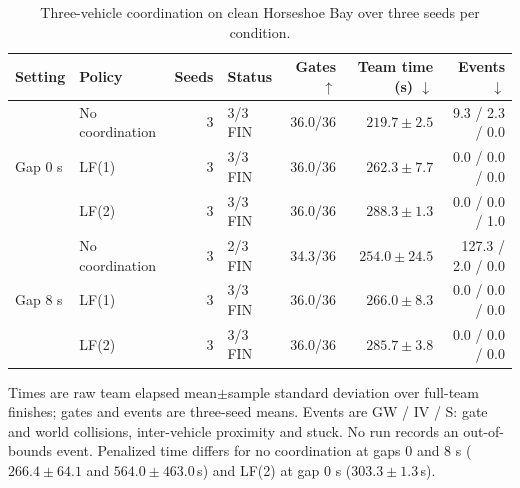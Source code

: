 \begin{table}[t]
\centering
\caption{Three-vehicle coordination on clean Horseshoe Bay over three seeds per condition.}
\label{tab:holoocean_coordination}
\mratablestyle
\begin{tabular}{llrlrrr}
\toprule
Setting & Policy & Seeds & Status & Gates $\uparrow$ & Team time (s) $\downarrow$ & Events $\downarrow$ \\
\midrule
\multirow{3}{*}{Gap 0 s}
 & No coordination & 3 & 3/3 FIN & 36.0/36 & $219.7\pm2.5$ & 9.3 / 2.3 / 0.0 \\
 & LF(1) & 3 & 3/3 FIN & 36.0/36 & $262.3\pm7.7$ & 0.0 / 0.0 / 0.0 \\
 & LF(2) & 3 & 3/3 FIN & 36.0/36 & $288.3\pm1.3$ & 0.0 / 0.0 / 1.0 \\
\midrule
\multirow{3}{*}{Gap 8 s}
 & No coordination & 3 & 2/3 FIN & 34.3/36 & $254.0\pm24.5$ & 127.3 / 2.0 / 0.0 \\
 & LF(1) & 3 & 3/3 FIN & 36.0/36 & $266.0\pm8.3$ & 0.0 / 0.0 / 0.0 \\
 & LF(2) & 3 & 3/3 FIN & 36.0/36 & $285.7\pm3.8$ & 0.0 / 0.0 / 0.0 \\
\bottomrule
\end{tabular}
\mratablenote Times are raw team elapsed mean$\pm$sample standard deviation over full-team finishes; gates and events are three-seed means. Events are GW / IV / S: gate and world collisions, inter-vehicle proximity and stuck. No run records an out-of-bounds event. Penalized time differs for no coordination at gaps 0 and 8 s ($266.4\pm64.1$ and $564.0\pm463.0$\,s) and LF(2) at gap 0 s ($303.3\pm1.3$\,s).
\end{table}
